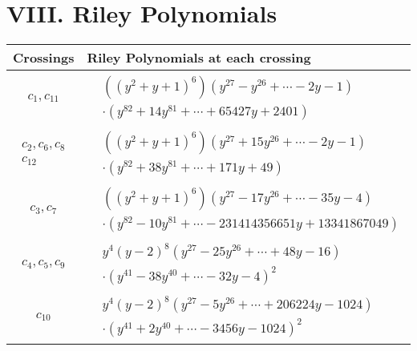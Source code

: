 \documentclass[1p]{elsarticle_modified}
\theoremstyle{definition}
\begin{document}
\centering \section*{ VIII. Riley Polynomials}
\begin{tabular}{m{50pt}|m{274pt}}
Crossings & \hspace{64pt}Riley Polynomials at each crossing \\
\hline $$\begin{aligned}c_{1},c_{11}\end{aligned}$$&$\begin{aligned}
&((y^2+y+1)^6)(y^{27}- y^{26}+\cdots-2 y-1)\\
&\cdot(y^{82}+14 y^{81}+\cdots+65427 y+2401)
\end{aligned}$\\
\hline $$\begin{aligned}c_{2},c_{6},c_{8}\\c_{12}\end{aligned}$$&$\begin{aligned}
&((y^2+y+1)^6)(y^{27}+15 y^{26}+\cdots-2 y-1)\\
&\cdot(y^{82}+38 y^{81}+\cdots+171 y+49)
\end{aligned}$\\
\hline $$\begin{aligned}c_{3},c_{7}\end{aligned}$$&$\begin{aligned}
&((y^2+y+1)^6)(y^{27}-17 y^{26}+\cdots-35 y-4)\\
&\cdot(y^{82}-10 y^{81}+\cdots-231414356651 y+13341867049)
\end{aligned}$\\
\hline $$\begin{aligned}c_{4},c_{5},c_{9}\end{aligned}$$&$\begin{aligned}
&y^4(y-2)^8(y^{27}-25 y^{26}+\cdots+48 y-16)\\
&\cdot(y^{41}-38 y^{40}+\cdots-32 y-4)^{2}
\end{aligned}$\\
\hline $$\begin{aligned}c_{10}\end{aligned}$$&$\begin{aligned}
&y^4(y-2)^8(y^{27}-5 y^{26}+\cdots+206224 y-1024)\\
&\cdot(y^{41}+2 y^{40}+\cdots-3456 y-1024)^{2}
\end{aligned}$\\
\hline
\end{tabular}
\vskip 2pc
\end{document}
